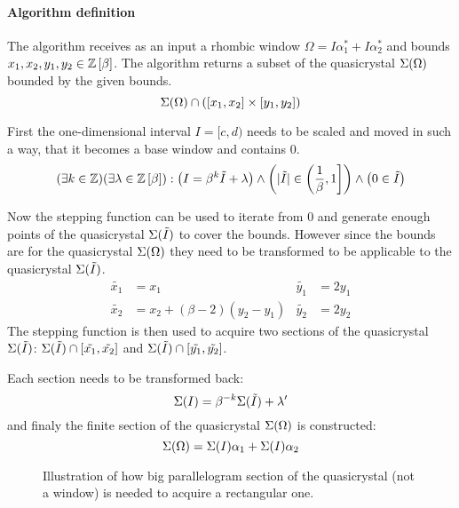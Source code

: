 \documentclass[text.tex]{subfiles}
\begin{document}
\paragraph{Algorithm definition} The algorithm receives as an input a rhombic window $\Omega = I\alpha_1^\ast + I\alpha_2^\ast$ and bounds $x_1, x_2, y_1, y_2 \in \mathbb{Z}\left[\beta\right]$.
The algorithm returns a subset of the quasicrystal $\Sigma(\Omega)$ bounded by the given bounds.
$$\Sigma(\Omega)\cap([x_1,x_2]\times[y_1,y_2])$$

First the one-dimensional interval $I = [c,d)$ needs to be scaled and moved in such a way, that it becomes a base window and contains $0$.
$$(\exists k\in\mathbb{Z})(\exists \lambda\in\mathbb{Z}\left[\beta\right]) : \left(I = \beta^k\tilde{I}+\lambda\right) \wedge \left(|\tilde{I}| \in \left(\frac{1}{\beta},1\right] \right)\wedge \left(0\in\tilde{I}\right)$$

Now the stepping function can be used to iterate from 0 and generate enough points of the quasicrystal $\Sigma(\tilde{I})$ to cover the bounds. However since the bounds are for the quasicrystal $\Sigma(\Omega)$ they need to be transformed to be applicable to the quasicrystal $\Sigma(\tilde{I})$. 
\begin{align*}
\tilde{x_1} &= x_1 & \tilde{y_1} &= 2y_1 \\
\tilde{x_2} &= x_2 + (\beta-2)(y_2-y_1) & \tilde{y_2} &= 2y_2 
\end{align*}
The stepping function is then used to acquire two sections of the quasicrystal $\Sigma(\tilde{I})$: $\Sigma(\tilde{I})\cap[\tilde{x_1},\tilde{x_2}]$ and $\Sigma(\tilde{I})\cap[\tilde{y_1},\tilde{y_2}]$.

Each section needs to be transformed back:
$$\Sigma(I) = \beta^{-k}\Sigma(\tilde{I}) + \lambda'$$
and finaly the finite section of the quasicrystal $\Sigma(\Omega)$ is constructed:
$$\Sigma(\Omega) = \Sigma(I)\alpha_1 + \Sigma(I)\alpha_2$$

\begin{figure}[h]
\centering
{}
\caption{Illustration of how big parallelogram section of the quasicrystal (not a window) is needed to acquire a rectangular one.}
\label{fig:finiteSectionRhombus}
\end{figure}
\end{document}
